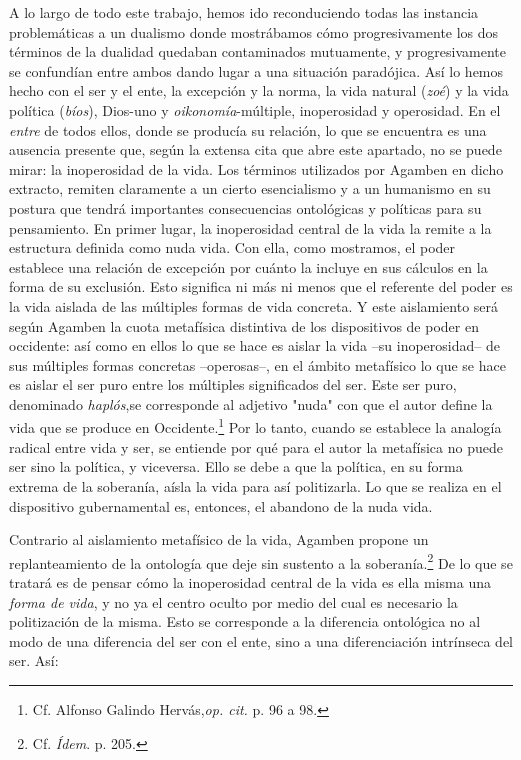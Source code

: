 A lo largo de todo este trabajo, hemos ido reconduciendo todas las
instancia problemáticas a un dualismo donde mostrábamos cómo
progresivamente los dos términos de la dualidad quedaban contaminados
mutuamente, y progresivamente se confundían entre ambos dando lugar a
una situación paradójica. Así lo hemos hecho con el ser y el ente, la
excepción y la norma, la vida natural (\emph{zoé}) y la vida política
(\emph{bíos}), Dios-uno y \emph{oikonomía}-múltiple, inoperosidad y
operosidad. En el \emph{entre} de todos ellos, donde se producía su
relación, lo que se encuentra es una ausencia presente que, según la
extensa cita que abre este apartado, no se puede mirar: la inoperosidad
de la vida. Los términos utilizados por Agamben en dicho extracto,
remiten claramente a un cierto esencialismo y a un humanismo en su
postura que tendrá importantes consecuencias ontológicas y políticas
para su pensamiento. En primer lugar, la inoperosidad central de la vida
la remite a la estructura definida como nuda vida. Con ella, como
mostramos, el poder establece una relación de excepción por cuánto la
incluye en sus cálculos en la forma de su exclusión. Esto significa ni
más ni menos que el referente del poder es la vida aislada de las
múltiples formas de vida concreta. Y este aislamiento será según Agamben
la cuota metafísica distintiva de los dispositivos de poder en
occidente: así como en ellos lo que se hace es aislar la vida --su
inoperosidad-- de sus múltiples formas concretas --operosas--, en el
ámbito metafísico lo que se hace es aislar el ser puro entre los
múltiples significados del ser. Este ser puro, denominado
\emph{haplós},se corresponde al adjetivo "nuda" con que el autor define
la vida que se produce en Occidente.\footnote{Cf. Alfonso Galindo
  Hervás,\emph{op. cit.} p. 96 a 98.} Por lo tanto, cuando se establece
la analogía radical entre vida y ser, se entiende por qué para el autor
la metafísica no puede ser sino la política, y viceversa. Ello se debe a
que la política, en su forma extrema de la soberanía, aísla la vida para
así politizarla. Lo que se realiza en el dispositivo gubernamental es,
entonces, el abandono de la nuda vida.

Contrario al aislamiento metafísico de la vida, Agamben propone un
replanteamiento de la ontología que deje sin sustento a la
soberanía.\footnote{Cf. \emph{Ídem}. p. 205.} De lo que se tratará es de
pensar cómo la inoperosidad central de la vida es ella misma una
\emph{forma de vida}, y no ya el centro oculto por medio del cual es
necesario la politización de la misma. Esto se corresponde a la
diferencia ontológica no al modo de una diferencia del ser con el ente,
sino a una diferenciación intrínseca del ser. Así:

